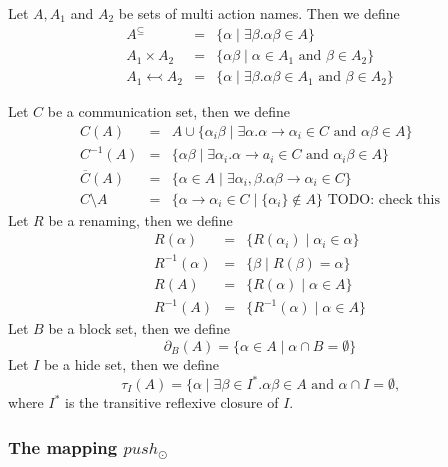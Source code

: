 \documentclass{article}
\begin{document}
Let $A,A_{1}$ and $A_{2}$ be sets of multi action names. Then we define%
\begin{eqnarray*}
A^{\subseteq } &=&\{\alpha \mid \exists \beta .\alpha \beta \in A\} \\
A_{1}\times A_{2} &=&\{\alpha \beta \mid \alpha \in A_{1}\text{ and }\beta
\in A_{2}\} \\
A_{1}\leftarrowtail A_{2} &=&\{\alpha \mid \exists \beta .\alpha \beta \in
A_{1}\text{ and }\beta \in A_{2}\}
\end{eqnarray*}

Let $C$ be a communication set, then we define%
\begin{eqnarray*}
C(A) &=&A\cup \{\alpha _{i}\beta \mid \exists \alpha .\alpha \rightarrow
\alpha _{i}\in C\text{ and }\alpha \beta \in A\} \\
C^{-1}(A) &=&\{\alpha \beta \mid \exists \alpha _{i}.\alpha \rightarrow
a_{i}\in C\text{ and }\alpha _{i}\beta \in A\} \\
\overline{C}(A) &=&\{\alpha \in A\mid \exists \alpha _{i},\beta .\alpha
\beta \rightarrow \alpha _{i}\in C\} \\
C\setminus A &=&\{\alpha \rightarrow \alpha _{i}\in C\mid \{\alpha
_{i}\}\notin A\}\text{ TODO: check this}
\end{eqnarray*}%
Let $R$ be a renaming, then we define%
\begin{eqnarray*}
R(\alpha ) &=&\{R(\alpha _{i})\mid \alpha _{i}\in \alpha \} \\
R^{-1}(\alpha ) &=&\{\beta \mid R(\beta )=\alpha \} \\
R(A) &=&\{R(\alpha )\mid \alpha \in A\} \\
R^{-1}(A) &=&\{R^{-1}(\alpha )\mid \alpha \in A\}
\end{eqnarray*}%
Let $B$ be a block set, then we define%
\[
\partial _{B}(A)=\{\alpha \in A\mid \alpha \cap B=\emptyset \}
\]%
Let $I$ be a hide set, then we define%
\[
\tau _{I}(A)=\{\alpha \mid \exists \beta \in I^{\ast }.\alpha \beta \in A%
\text{ and }\alpha \cap I=\emptyset \text{,}
\]%
where $I^{\ast }$ is the transitive reflexive closure of $I$.\newpage 

\subsubsection{The mapping $push_{\odot }$}
\end{document}
